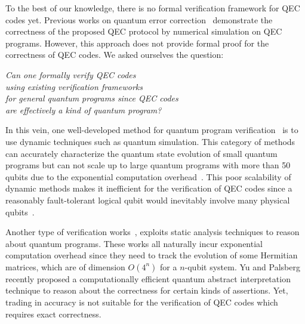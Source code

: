 To the best of our knowledge, there is no formal verification framework for QEC codes yet.
Previous works on quantum error correction~\cite{Fowler2012SurfaceCT, Chamberland2020TopologicalAS, Lao2020FaulttolerantQE, Chao2019FlagFE, Noh2020FaulttolerantBQ} demonstrate the correctness of the proposed QEC protocol by numerical simulation on QEC programs. 
However, this approach does not provide formal proof for the correctness of QEC codes.
We asked ourselves the question:












\begin{center}
    \textit{Can one formally verify QEC codes}\\
    \textit{using existing verification frameworks}\\
    \textit{for general quantum programs since QEC codes} \\
	\textit{are effectively a kind of quantum program?}
\end{center}


In this vein, one well-developed method for quantum program verification~\cite{ Wu2019FullstateQC,Zhou2019AnAQ, Li2020ProjectionbasedRA} is to use dynamic techniques such as quantum simulation. 
This category of methods can accurately characterize the quantum state evolution of small quantum programs but can not scale up to large quantum programs with more than 50 qubits due to the exponential computation overhead~\cite{Wu2019FullstateQC}.
This poor scalability of dynamic methods makes it inefficient for the verification of QEC codes since  
a reasonably fault-tolerant logical qubit would inevitably involve many physical qubits~\cite{Fowler2012SurfaceCT}.

Another type of verification works~\cite{Ying2012FloydhoareLF, Ying2018ReasoningAP, Unruh2019QuantumHL, DHondt2006QuantumWP,Selinger2004TowardsAQ, Feng2020QuantumHL, Feng2021VerificationOD}, exploits static analysis techniques to reason about quantum programs. 
These works all naturally incur exponential computation overhead since they need to track the evolution of some Hermitian matrices, which are of dimension $O(4^n)$ for a $n$-qubit system. 
Yu and Palsberg~\cite{Yu2021QuantumAI} recently proposed a computationally efficient quantum abstract interpretation technique to reason about the correctness for certain kinds of assertions.
Yet, trading in accuracy is not suitable for the verification of QEC codes which requires exact correctness.















